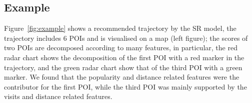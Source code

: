 \subsection{Example}
\label{sec:example}

Figure~\ref{fig:example} shows a recommended trajectory by the SR model, 
the trajectory includes 6 POIs and is visualised on a map (left figure);
the scores of two POIs are decomposed according to many features,
in particular, the red radar chart shows the decomposition of the first POI with a red marker in the trajectory,
and the green radar chart show that of the third POI with a green marker. 
We found that the popularity and distance related features were the contributor for the first POI, 
while the third POI was mainly supported by the visits and distance related features.




